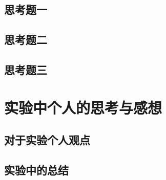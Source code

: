 \documentclass{ctexart}
\begin{document}
  \subsection{思考题一}
  \subsection{思考题二}
  \subsection{思考题三}

\section{实验中个人的思考与感想}
  \subsection{对于实验个人观点}
  \subsection{实验中的总结}
\end{document}
